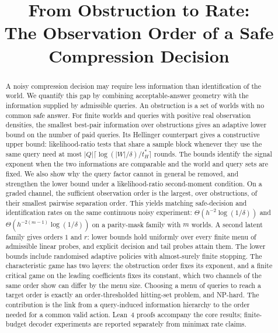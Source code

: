 



\title{From Obstruction to Rate:\\The Observation Order of a Safe Compression Decision}

\author{
}

\maketitle

\begin{abstract}
A noisy compression decision may require less information than identification of the world.
We quantify this gap by combining acceptable-answer geometry with the information supplied
by admissible queries. An obstruction is a set of worlds with no common safe answer.
For finite worlds and queries with positive real observation densities, the smallest
best-pair information over obstructions gives an adaptive lower bound on the number of paid
queries. Its Hellinger counterpart gives a constructive upper bound: likelihood-ratio tests
that share a sample block whenever they use the same query need at most
$|Q|\lceil\log(|W|/\delta)/t_H^*\rceil$ rounds.
The bounds identify the signal exponent when the two informations are comparable and the
world and query sets are fixed. We also show why the query factor cannot in general be
removed, and strengthen the lower bound under a likelihood-ratio second-moment condition.
On a graded channel, the sufficient observation order is the largest, over obstructions, of
their smallest pairwise separation order. This yields matching safe-decision and identification
rates on the same continuous noisy experiment: $\Theta(h^{-2}\log(1/\delta))$ and
$\Theta(h^{-2(m-1)}\log(1/\delta))$ on a parity-mask family with $m$ worlds.
A second latent family gives orders $1$ and $r$: lower bounds hold uniformly over every
finite menu of admissible linear probes, and explicit decision and tail probes attain them.
The lower bounds include randomised adaptive policies with almost-surely finite stopping.
The characteristic game has two layers: the obstruction order fixes its exponent, and a finite
critical game on the leading coefficients fixes its constant, which two channels of the same
order show can differ by the menu size. Choosing a menu of queries to reach a target order is
exactly an order-thresholded hitting-set problem, and NP-hard.
The contribution is the link from a query-induced information hierarchy to the order needed
for a common valid action. Lean~4 proofs accompany the core results; finite-budget decoder
experiments are reported separately from minimax rate claims.
\end{abstract}

